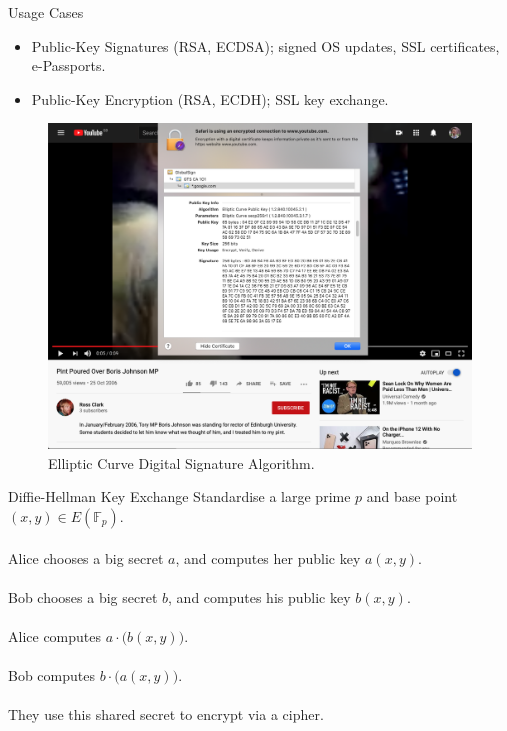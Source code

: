 \documentclass{beamer}
\begin{document}
\begin{frame}[t]{Usage Cases}
	\begin{itemize}
		\item Public-Key Signatures (RSA, ECDSA); signed OS updates, SSL certificates, e-Passports.
		\item Public-Key Encryption (RSA, ECDH); SSL key exchange.
	\end{itemize}
	\begin{figure}[h]
	\centering
		\includegraphics[width=13cm]{youtube}
		\caption{Elliptic Curve Digital Signature Algorithm.}
	\end{figure}
\end{frame}

\begin{frame}[t]{Diffie-Hellman Key Exchange}
	Standardise a large prime $p$ and base point $(x,y) \in E(\mathbb{F}_{p})$. \\~\\
	
	Alice chooses a big secret $a$, and computes her public key $a(x,y)$. \\~\\
	
	Bob chooses a big secret $b$, and computes his public key $b(x,y)$. \\~\\
	
	Alice computes $a\cdot \big(b(x,y) \big)$. \\~\\
	
	Bob computes $b \cdot \big( a(x,y)\big)$. \\~\\
	
	They use this shared secret to encrypt via a cipher.
\end{frame}
\end{document}
